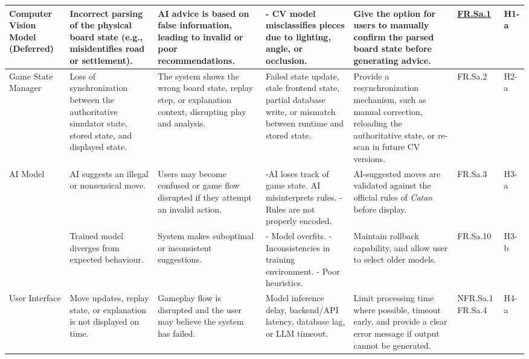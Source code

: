 \documentclass{article}
\begin{document}
\begin{landscape}
\begin{tabularx}{\linewidth}{|P{2.3cm}|Y|Y|Y|Y|P{1.4cm}|P{0.8cm}|}
        \hline
        \endlastfoot

        Computer Vision Model (Deferred) &
        Incorrect parsing of the physical board state (e.g., misidentifies road or settlement). &
        AI advice is based on false information, leading to invalid or poor recommendations. &
        - CV model misclassifies pieces due to lighting, angle, or occlusion. &
        Give the option for users to manually confirm the parsed board state before generating advice. &
        \hyperref[FR.Sa.1]{FR.Sa.1} &
        H1-a \\

        \hline

        Game State Manager &
        Loss of synchronization between the authoritative simulator state, stored state, and displayed state. &
        The system shows the wrong board state, replay step, or explanation context, disrupting play and analysis. &
        Failed state update, stale frontend state, partial database write, or mismatch between runtime and stored state. &
        Provide a resynchronization mechanism, such as manual correction, reloading the authoritative state, or re-scan in future CV versions. &
        FR.Sa.2 &
        H2-a \\

        \hline

        AI Model &
        AI suggests an illegal or nonsensical move. &
        Users may become confused or game flow disrupted if they attempt an invalid action. &
        -AI loses track of game state. \newline AI misinterprets rules. \newline - Rules are not properly encoded. &
        AI-suggested moves are validated against the official rules of \emph{Catan} before display. &
        FR.Sa.3 &
        H3-a \\

        &
        Trained model diverges from expected behaviour. &
        System makes suboptimal or inconsistent suggestions. &
        - Model overfits. \newline - Inconsistencies in training environment. \newline - Poor heuristics. &
        Maintain rollback capability, and allow user to select older models. &
        FR.Sa.10 &
        H3-b \\

        \hline

        User Interface &
        Move updates, replay state, or explanation is not displayed on time. &
        Gameplay flow is disrupted and the user may believe the system has failed. &
        Model inference delay, backend/API latency, database lag, or LLM timeout. &
        Limit processing time where possible, timeout early, and provide a clear error message if output cannot be generated. &
        NFR.Sa.1 \newline FR.Sa.4 &
        H4-a \\


\end{tabularx}
\end{landscape}
\end{document}
